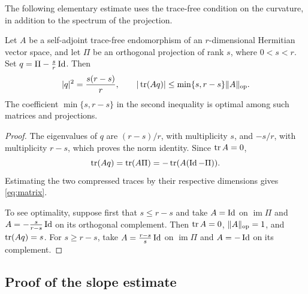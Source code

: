 The following elementary estimate uses the trace-free condition on the
curvature, in addition to the spectrum of the projection.

\begin{lemma}\label{lem:matrix}
Let $A$ be a self-adjoint trace-free endomorphism of an $r$-dimensional
Hermitian vector space, and let $\Pi$ be an orthogonal projection of
rank $s$, where $0<s<r$. Set $q=\Pi-\frac{s}{r}\operatorname{Id}$. Then
\begin{equation}\label{eq:matrix}
 |q|^2=\frac{s(r-s)}{r},\qquad
 |\operatorname{tr}(Aq)|\le\min\{s,r-s\}\lVert A\rVert_{\mathrm{op}}.
\end{equation}
The coefficient $\min\{s,r-s\}$ in the second inequality is optimal
among such matrices and projections.
\end{lemma}

\begin{proof}
The eigenvalues of $q$ are $(r-s)/r$, with multiplicity $s$, and
$-s/r$, with multiplicity $r-s$, which proves the norm identity.
Since $\operatorname{tr} A=0$,
\[
 \operatorname{tr}(Aq)=\operatorname{tr}(A\Pi)=-\operatorname{tr}(A(\operatorname{Id}-\Pi)).
\]
Estimating the two compressed traces by their respective dimensions
gives \eqref{eq:matrix}.

To see optimality, suppose first that $s\le r-s$ and take
$A=\operatorname{Id}$ on $\operatorname{im}\Pi$ and
$A=-\frac{s}{r-s}\operatorname{Id}$ on its orthogonal complement. Then
$\operatorname{tr} A=0$, $\lVert A\rVert_{\mathrm{op}}=1$, and $\operatorname{tr}(Aq)=s$.
For $s\ge r-s$, take $A=\frac{r-s}{s}\operatorname{Id}$ on
$\operatorname{im}\Pi$ and $A=-\operatorname{Id}$ on its complement.
\end{proof}

\subsection{Proof of the slope estimate}

